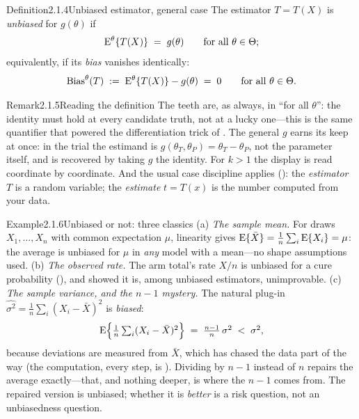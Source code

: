 \documentclass[main.tex]{subfiles}
\begin{document}
\begin{Obj}{Definition}{2.1.4}{Unbiased estimator, general case}
The estimator $T=T(X)$ is \emph{unbiased} for $g(\theta)$ if
\[ \mathrm{E}^{\theta}\{T(X)\} \;=\; g(\theta) \qquad\text{for all } \theta\in\Theta ; \]
equivalently, if its \emph{bias} vanishes identically:
\[ \mathrm{Bias}^{\theta}(T) \;:=\; \mathrm{E}^{\theta}\{T(X)\} - g(\theta) \;=\; 0
   \qquad\text{for all } \theta\in\Theta . \]
\end{Obj}

\begin{ObjL}{Remark}{2.1.5}{Reading the definition}
The teeth are, as always, in ``for all $\theta$'': the identity must hold at every candidate
truth, not at a lucky one---this is the same quantifier that powered the differentiation
trick of . The general $g$ earns its keep at once: in the trial the estimand is
$g(\theta_T,\theta_P)=\theta_T-\theta_P$, not the parameter itself, and  is
recovered by taking $g$ the identity. For $k>1$ the display is read coordinate by
coordinate. And the usual case discipline applies (): the \emph{estimator} $T$
is a random variable; the \emph{estimate} $t=T(x)$ is the number computed from your data.
\end{ObjL}

\begin{ObjL}{Example}{2.1.6}{Unbiased or not: three classics}
(a) \emph{The sample mean.} For draws $X_1,\dots,X_n$ with common expectation $\mu$,
linearity gives $\mathrm{E}\{\bar X\}=\tfrac1n\sum_i \mathrm{E}\{X_i\}=\mu$: the average is unbiased for
$\mu$ in \emph{any} model with a mean---no shape assumptions used.
(b) \emph{The observed rate.} The arm total's rate $X/n$ is unbiased for a cure probability
(), and  showed it is, among unbiased estimators, unimprovable.
(c) \emph{The sample variance, and the $n-1$ mystery.} The natural plug-in
$\widehat{\sigma^2}=\frac1n\sum_i (X_i-\bar X)^2$ is \emph{biased}:
\[ \mathrm{E}\Big\{\tfrac1n\textstyle\sum_i (X_i-\bar X)^2\Big\} \;=\; \frac{n-1}{n}\,\sigma^2
   \;<\;\sigma^2 , \]
because deviations are measured from $\bar X$, which has chased the data part of the way
(the computation, every step, is ). Dividing by $n-1$ instead of $n$ repairs
the average exactly---that, and nothing deeper, is where the $n-1$ comes from. The repaired
version is unbiased; whether it is \emph{better} is a risk question, not an unbiasedness
question.
\end{ObjL}
\end{document}
